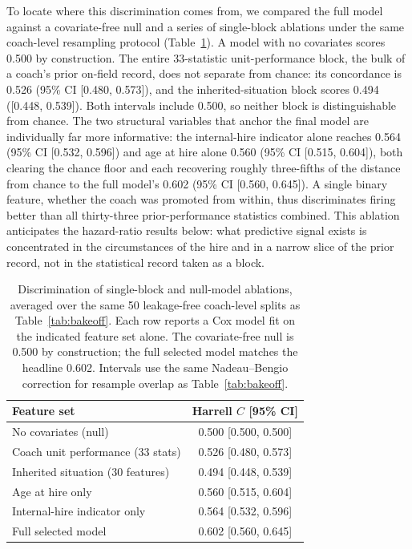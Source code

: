 \documentclass[USenglish]{article}
\theoremstyle{dgthm}
\theoremstyle{dgdef}
\begin{document}
To locate where this discrimination comes from, we compared the full model against a covariate-free null and a series of single-block ablations under the same coach-level resampling protocol (Table~\ref{tab:ablation}). A model with no covariates scores 0.500 by construction. The entire 33-statistic unit-performance block, the bulk of a coach's prior on-field record, does not separate from chance: its concordance is 0.526 (95\% CI [0.480, 0.573]), and the inherited-situation block scores 0.494 ([0.448, 0.539]). Both intervals include 0.500, so neither block is distinguishable from chance. The two structural variables that anchor the final model are individually far more informative: the internal-hire indicator alone reaches 0.564 (95\% CI [0.532, 0.596]) and age at hire alone 0.560 (95\% CI [0.515, 0.604]), both clearing the chance floor and each recovering roughly three-fifths of the distance from chance to the full model's 0.602 (95\% CI [0.560, 0.645]). A single binary feature, whether the coach was promoted from within, thus discriminates firing better than all thirty-three prior-performance statistics combined. This ablation anticipates the hazard-ratio results below: what predictive signal exists is concentrated in the circumstances of the hire and in a narrow slice of the prior record, not in the statistical record taken as a block.

\begin{table}[!ht]
\caption{Discrimination of single-block and null-model ablations, averaged over the same 50 leakage-free coach-level splits as Table~\ref{tab:bakeoff}. Each row reports a Cox model fit on the indicated feature set alone. The covariate-free null is 0.500 by construction; the full selected model matches the headline 0.602. Intervals use the same Nadeau--Bengio correction for resample overlap as Table~\ref{tab:bakeoff}.}
\label{tab:ablation}
\small
\begin{tabular}{lc}
\toprule
Feature set & Harrell $C$ [95\% CI] \\
\midrule
No covariates (null) & 0.500 [0.500, 0.500] \\
Coach unit performance (33 stats) & 0.526 [0.480, 0.573] \\
Inherited situation (30 features) & 0.494 [0.448, 0.539] \\
Age at hire only & 0.560 [0.515, 0.604] \\
Internal-hire indicator only & 0.564 [0.532, 0.596] \\
Full selected model & 0.602 [0.560, 0.645] \\
\bottomrule
\end{tabular}
\end{table}
\end{document}
